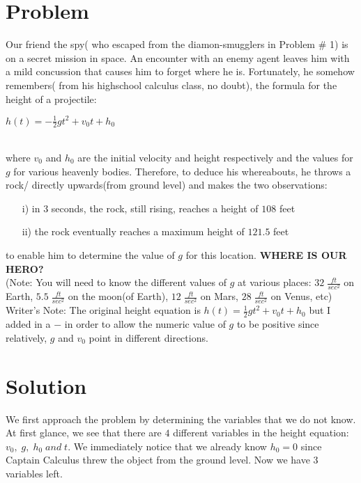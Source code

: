 \documentclass[titlepage]{article}
\title{Spy Problem #2}
\author{Kevin, Richard, Daniel, Andrew}
\begin{document}
\maketitle
\section{Problem}
Our friend the spy( who escaped from the diamon-smugglers in Problem # 1) is on a secret mission in space. An encounter with an enemy agent leaves him with a mild concussion that causes him to forget where he is. Fortunately, he somehow remembers( from his highschool calculus class, no doubt), the formula for the height of a projectile:\\
\begin{center}
	$h(t) = -\frac{1}{2}gt^2+v_0t+h_0$
\end{center}
\\
where $v_0$ and $h_0$ are the initial velocity and height respectively and the values for $g$ for various heavenly bodies. Therefore, to deduce his whereabouts, he throws a rock/ directly upwards(from ground level) and makes the two observations:
\begin{enumerate}
	\item[i)]
	in 3 seconds, the rock, still rising, reaches a height of $108$ feet
	\item[ii)]
	the rock eventually reaches a maximum height of $121.5$ feet
\end{enumerate}
to enable him to determine the value of $g$ for this location. \textbf{WHERE IS OUR HERO?}
\\
(Note: You will need to know the different values of $g$ at various places: $32\;\frac{ft}{sec^2}$ on Earth, $5.5\;\frac{ft}{sec^2}$ on the moon(of Earth), $12\;\frac{ft}{sec^2}$ on Mars, $28\;\frac{ft}{sec^2}$ on Venus, etc)\\

Writer's Note: The original height equation is $h(t) = \frac{1}{2}gt^2+v_0t+h_0$ but I added in a $-$ in order to allow the numeric value of $g$ to be positive since relatively, $g$ and $v_0$ point in different directions.
\section{Solution}
We first approach the problem by determining the variables that we do not know. At first glance, we see that there are $4$ different variables in the height equation: $v_0,\;g,\;h_0\; and\; t$. We immediately notice that we already know $h_0 = 0$ since Captain Calculus threw the object from the ground level. Now we have 3 variables left.\\
\end{document}
